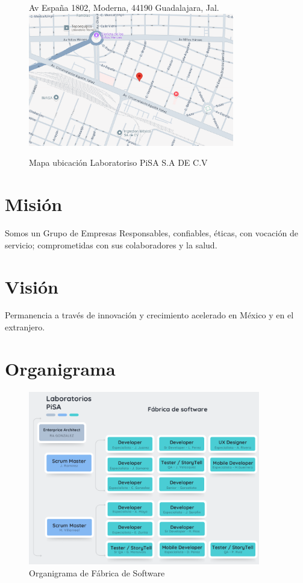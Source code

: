 \documentclass[12pt,letterpaper,spanish, xcolor=table]{report}
\begin{document}
\begin{figure}[htp]
	\centering
	Av España 1802, Moderna, 44190 Guadalajara, Jal.
	\includegraphics[width=0.8\textwidth]{Imagenes/ubicacion.png}
	\caption{Mapa ubicación Laboratoriso PiSA S.A DE C.V}\label{a1}
\end{figure}




\section{Misión}
Somos un Grupo de Empresas Responsables, confiables, éticas, con vocación de servicio; comprometidas con sus colaboradores y la salud.

\section{Visión}
Permanencia a través de innovación y crecimiento acelerado en México y en el extranjero.
	
\section{Organigrama}

\begin{figure}[H]
	\centering
	\includegraphics[width=0.9\textwidth]{Imagenes/OrganigramaPisa.png}
	\caption{Organigrama de Fábrica de Software}\label{a1}
\end{figure}
	
\end{document}
